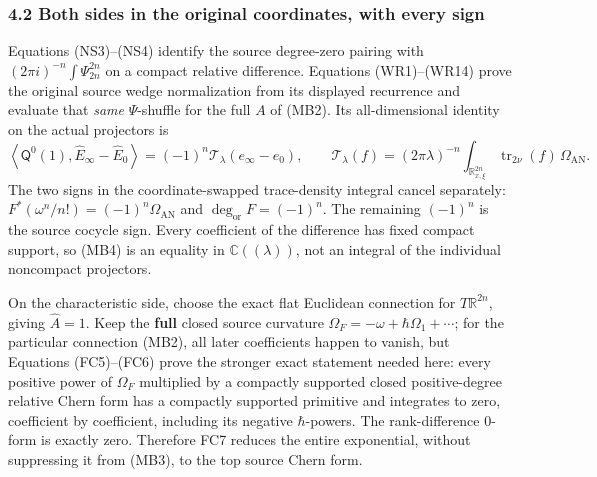\documentclass[
  11pt,
]{article}
\begin{document}
\subsubsection{4.2 Both sides in the original coordinates, with every
sign}\label{both-sides-in-the-original-coordinates-with-every-sign}

Equations (NS3)--(NS4) identify the source degree-zero pairing with
\((2\pi i)^{-n}\int\Psi_{2n}^{2n}\) on a compact relative difference.
Equations (WR1)--(WR14) prove the original source wedge normalization
from its displayed recurrence and evaluate that \emph{same}
\(\Psi\)-shuffle for the full \(A\) of (MB2). Its all-dimensional
identity on the actual projectors is \[
 \left\langle\mathsf Q^0(1),
       \widehat E_\infty-\widehat E_0\right\rangle
  =(-1)^n\mathcal T_\lambda(e_\infty-e_0),\qquad
 \mathcal T_\lambda(f)
   =(2\pi\lambda)^{-n}
      \int_{\mathbb R^{2n}_{x,\xi}}
        \operatorname{tr}_{2\nu}(f)\,\Omega_{\mathrm{AN}} .
 \tag{MB4}
\] The two signs in the coordinate-swapped trace-density integral cancel
separately: \(F^*(\omega^n/n!)=(-1)^n\Omega_{\mathrm{AN}}\) and
\(\deg_{\mathrm{or}}F=(-1)^n\). The remaining \((-1)^n\) is the source
cocycle sign. Every coefficient of the difference has fixed compact
support, so (MB4) is an equality in \(\mathbb C((\lambda))\), not an
integral of the individual noncompact projectors.

On the characteristic side, choose the exact flat Euclidean connection
for \(T\mathbb R^{2n}\), giving \(\hat A=1\). Keep the \textbf{full}
closed source curvature \(\Omega_F=-\omega+\hbar\Omega_1+\cdots\); for
the particular connection (MB2), all later coefficients happen to
vanish, but Equations (FC5)--(FC6) prove the stronger exact statement
needed here: every positive power of \(\Omega_F\) multiplied by a
compactly supported closed positive-degree relative Chern form has a
compactly supported primitive and integrates to zero, coefficient by
coefficient, including its negative \(\hbar\)-powers. The
rank-difference \(0\)-form is exactly zero. Therefore FC7 reduces the
entire exponential, without suppressing it from (MB3), to the top source
Chern form.
\end{document}
